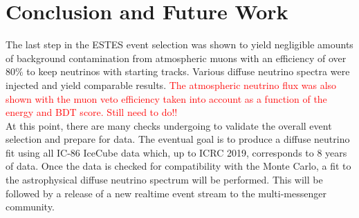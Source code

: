 \documentclass{PoS}
\begin{document}
\section{Conclusion and Future Work}\label{sec:Conclusion}
The last step in the ESTES event selection was shown to yield negligible amounts of background contamination from atmospheric muons with an efficiency of over 80$\%$ to keep neutrinos with starting tracks. Various diffuse neutrino spectra were injected and yield comparable results. \textcolor{red}{The atmospheric neutrino flux was also shown with the muon veto efficiency taken into account as a function of the energy and BDT score. Still need to do!!}
\\
At this point, there are many checks undergoing to validate the overall event selection and prepare for data. The eventual goal is to produce a diffuse neutrino fit using all IC-86 IceCube data which, up to ICRC 2019, corresponds to 8 years of data. Once the data is checked for compatibility with the Monte Carlo, a fit to the astrophysical diffuse neutrino spectrum will be performed. This will be followed by a release of a new realtime event stream to the multi-messenger community.





\end{document}
